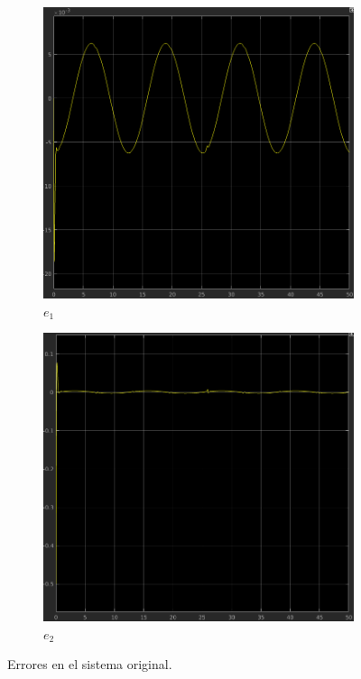 \documentclass[12pt, letterpaper]{article}
\begin{document}
\begin{figure}[H]
	\centering
	\begin{subfigure}[b]{0.49\linewidth}
		\includegraphics[width=\linewidth]{e1a200.png}
		\caption{$e_1$}
	\end{subfigure}
	\begin{subfigure}[b]{0.49\linewidth}
		\includegraphics[width=\linewidth]{e2a200.png}
		\caption{$e_2$}
	\end{subfigure}
	\caption{Errores en el sistema original.}
\end{figure}
\end{document}
